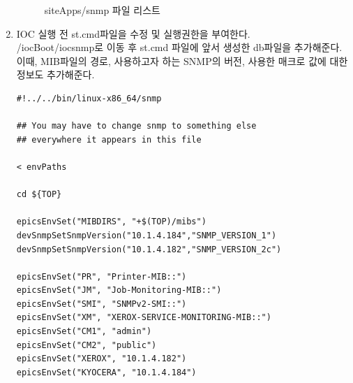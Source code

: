 \documentclass[11pt
  , a4paper
  , article
  , oneside
]{memoir}
\begin{document}
\begin{enumerate}
\begin{figure}[!h]
  \centering
              \hfill
              \hfill
            
  \caption
      {
        siteApps/snmp 파일 리스트 
      }
 \label{fig:appmake}
\end{figure}

\item IOC 실행 전 st.cmd파일을 수정 및 실행권한을 부여한다.\\
/iocBoot/iocsnmp로 이동 후 st.cmd 파일에 앞서 생성한 db파일을 추가해준다. 이때, MIB파일의 경로, 사용하고자 하는 SNMP의 버전, 사용한 매크로 값에 대한 정보도 추가해준다.

\begin{lstlisting}[style=termstylenumber]
#!../../bin/linux-x86_64/snmp

## You may have to change snmp to something else
## everywhere it appears in this file

< envPaths

cd ${TOP}

epicsEnvSet("MIBDIRS", "+$(TOP)/mibs")
devSnmpSetSnmpVersion("10.1.4.184","SNMP_VERSION_1")
devSnmpSetSnmpVersion("10.1.4.182","SNMP_VERSION_2c")

epicsEnvSet("PR", "Printer-MIB::")
epicsEnvSet("JM", "Job-Monitoring-MIB::")
epicsEnvSet("SMI", "SNMPv2-SMI::")
epicsEnvSet("XM", "XEROX-SERVICE-MONITORING-MIB::")
epicsEnvSet("CM1", "admin")
epicsEnvSet("CM2", "public")
epicsEnvSet("XEROX", "10.1.4.182")
epicsEnvSet("KYOCERA", "10.1.4.184")


\end{lstlisting}
\end{enumerate}
\end{document}
